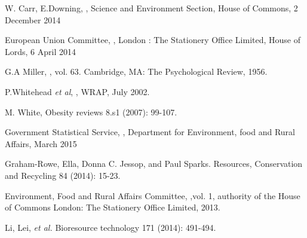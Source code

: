 \documentclass[a4paper, 11pt]{article}
\begin{document}
\begin{thebibliography}{29}

W. Carr, E.Downing, \emph{}, Science and Environment Section, House of Commons, 2 December 2014
\vspace{\baselineskip}

European Union Committee, \emph{}, London : The Stationery Office Limited, House of Lords, 6 April 2014
\vspace{\baselineskip}

G.A Miller, \emph{}, vol. 63. Cambridge, MA: The Psychological Review, 1956.
\vspace{\baselineskip}

P.Whitehead \emph{et al}, \emph{}, WRAP, July 2002.
\vspace{\baselineskip}

M. White, \emph{} Obesity reviews 8.s1 (2007): 99-107.
\vspace{\baselineskip}

Government Statistical Service, \emph{}, Department for Environment, food and Rural Affairs, March 2015
\vspace{\baselineskip}

Graham-Rowe, Ella, Donna C. Jessop, and Paul Sparks.\emph{} Resources, Conservation and Recycling 84 (2014): 15-23.
\vspace{\baselineskip}

Environment, Food and Rural Affairs Committee, \emph{},vol. 1, authority of the House of Commons London: The Stationery Office Limited, 2013.
\vspace{\baselineskip}

Li, Lei, \emph{et al.} \emph{} Bioresource technology 171 (2014): 491-494.
\vspace{\baselineskip}


\end{thebibliography}
\end{document}
